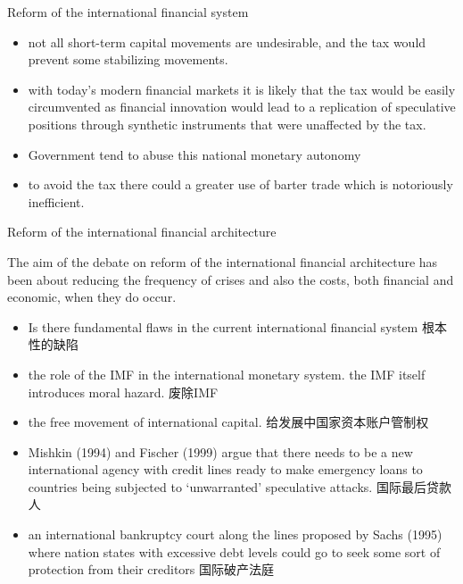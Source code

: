 \documentclass[10pt,hyperref={CJKbookmarks=true},xcolor=dvipsnames,aspectratio=169]{beamer}
\begin{document}
\begin{frame}[allowframebreaks]{Reform of the international financial system}
\begin{itemize}
\begin{itemize}
\begin{itemize}
			\item not all short-term capital movements are undesirable, and the tax would prevent
			some stabilizing movements.
			\item with today’s
			modern financial markets it is likely that the tax would be easily circumvented as
			financial innovation would lead to a replication of speculative positions through
			synthetic instruments that were unaffected by the tax.
			\item Government tend to abuse this national monetary autonomy
			\item to avoid the tax there could a greater use of barter trade which is
			notoriously inefficient.
		\end{itemize}
		\end{itemize}
	\end{itemize}
\end{frame}


\begin{frame}{Reform of the international financial architecture}

The aim of the debate on reform of the international financial architecture has been
about reducing the frequency of crises and also the costs, both financial and economic,
when they do occur. 
\begin{itemize}
	\item Is there fundamental flaws in the current international financial system 根本性的缺陷
	\item  the role of the IMF in the international monetary system.  the IMF itself introduces moral hazard. 废除IMF
	\item  the free movement of international capital. 给发展中国家资本账户管制权
	\item Mishkin (1994) and Fischer (1999) argue that there needs	to be a new international agency with credit
	lines ready to make emergency loans to countries being subjected to ‘unwarranted’
	speculative attacks. 国际最后贷款人
	\item an international bankruptcy	court along the lines proposed by Sachs (1995) where nation states with excessive
	debt levels could go to seek some sort of protection from their creditors 国际破产法庭
	
\end{itemize}
\end{frame}
\end{document}
